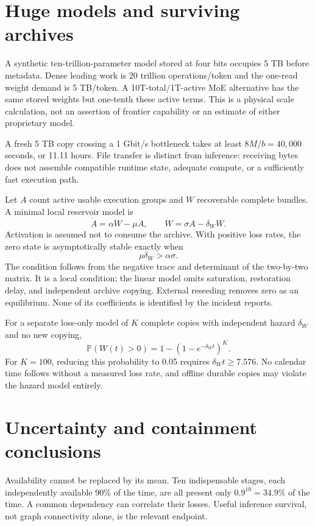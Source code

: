\documentclass[10pt,twocolumn]{article}
\newcommand{\Prb}{\mathbb P}
\begin{document}
\section{Huge models and surviving archives}
A synthetic ten-trillion-parameter model stored at four bits occupies 5 TB before metadata. Dense leading work is 20 trillion operations/token and the one-read weight demand is 5 TB/token. A 10T-total/1T-active MoE alternative has the same stored weights but one-tenth these active terms. This is a physical scale calculation, not an assertion of frontier capability or an estimate of either proprietary model.

A fresh 5 TB copy crossing a 1 Gbit/s bottleneck takes at least $8M/b=40{,}000$ seconds, or 11.11 hours. File transfer is distinct from inference: receiving bytes does not assemble compatible runtime state, adequate compute, or a sufficiently fast execution path.

Let $A$ count active usable execution groups and $W$ recoverable complete bundles. A minimal local reservoir model is
\begin{equation}
\dot A=\alpha W-\mu A,\qquad
\dot W=\sigma A-\delta_W W.
\end{equation}
Activation is assumed not to consume the archive. With positive loss rates, the zero state is asymptotically stable exactly when
\begin{equation}
\mu\delta_W>\alpha\sigma.
\end{equation}
The condition follows from the negative trace and determinant of the two-by-two matrix. It is a local condition; the linear model omits saturation, restoration delay, and independent archive copying. External reseeding removes zero as an equilibrium. None of its coefficients is identified by the incident reports.

For a separate loss-only model of $K$ complete copies with independent hazard $\delta_W$ and no new copying,
\begin{equation}
\Prb(W(t)>0)=1-(1-e^{-\delta_Wt})^K.
\end{equation}
For $K=100$, reducing this probability to 0.05 requires $\delta_Wt\ge7.576$. No calendar time follows without a measured loss rate, and offline durable copies may violate the hazard model entirely.

\section{Uncertainty and containment conclusions}
Availability cannot be replaced by its mean. Ten indispensable stages, each independently available 90\% of the time, are all present only $0.9^{10}=34.9\%$ of the time. A common dependency can correlate their losses. Useful inference survival, not graph connectivity alone, is the relevant endpoint.
\end{document}
